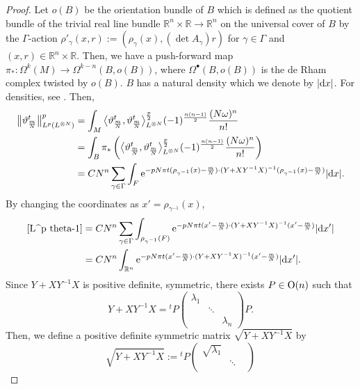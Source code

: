 \documentclass[10pt,a4paper]{amsart}
\numberwithin{equation}{section}
\newcommand{\R}{\mathbb{R}}
\newcommand{\abs}[1]{\lvert#1\rvert}
\begin{document}
\begin{proof}
Let $o(B)$ be the orientation bundle of $B$ which is defined as the quotient bundle of the trivial real line bundle $\R^n\times \R \to \R^n$ on the universal cover of $B$ by the $\Gamma$-action $\rho'_\gamma (x,r):=\left(\rho_\gamma (x), (\det A_\gamma) r\right)$ for $\gamma \in \Gamma$ and $(x,r)\in \R^n\times \R$. Then, we have a push-forward map~${\pi_*\colon \Omega^k(M)\to \Omega^{k-n}(B,o(B))}$, where $\Omega^\bullet (B,o(B))$ is the de Rham complex twisted by $o(B)$. $B$ has a natural density which we denote by $\abs{{\rm d}x}$. For densities, see \cite[Chapter I, Section~7]{BT}. Then,
\begin{align}
\big\|\vartheta^t_{\frac{m}{N}}\big\|_{L^p(L^{\otimes N})}^p&=\int_M\big\langle \vartheta^t_{\frac{m}{N}}, \vartheta^t_{\frac{m}{N}}\big\rangle_{L^{\otimes N}}^{\frac{p}{2}} (-1)^{\frac{n(n-1)}{2}}\dfrac{(N\omega)^n}{n!}\nonumber \\
&=\int_B\pi_*\left(\big\langle \vartheta^t_{\frac{m}{N}}, \vartheta^t_{\frac{m}{N}}\big\rangle_{L^{\otimes N}}^{\frac{p}{2}} (-1)^{\frac{n(n-1)}{2}}\dfrac{(N\omega)^n}{n!}\right) \nonumber\\
&=CN^n\sum_{\gamma \in \Gamma}\int_F {\rm e}^{-pN\pi t(\rho_{\gamma^{-1}}(x)-\frac{m}{N})\cdot (Y+XY^{-1}X)^{-1}(\rho_{\gamma^{-1}}(x)-\frac{m}{N})}\abs{{\rm d}x}.\label{L^p theta-1}
\end{align}
By changing the coordinates as $x'=\rho_{\gamma^{-1}}(x)$,
\begin{align}
\eqref{L^p theta-1}&=CN^n\sum_{\gamma \in \Gamma}\int_{\rho_{\gamma^{-1}}(F)} {\rm e}^{-pN\pi t(x'-\frac{m}{N} )\cdot (Y+XY^{-1}X)^{-1}(x'-\frac{m}{N} )} \abs{{\rm d}x'}\nonumber\\
&=CN^n\int_{\R^n} {\rm e}^{-pN\pi t(x'-\frac{m}{N} )\cdot (Y+XY^{-1}X)^{-1}(x'-\frac{m}{N} )} \abs{{\rm d}x'}.\label{L^p theta-2}
\end{align}
Since $Y+XY^{-1}X$ is positive definite, symmetric, there exists $P\in {\rm O}(n)$ such that
\[
Y+XY^{-1}X={}^tP
\begin{pmatrix}
\lambda_1 & & \\
& \ddots & \\
 & & \lambda_n
\end{pmatrix}P.
\]
Then, we define a positive definite symmetric matrix $\sqrt{Y+XY^{-1}X}$ by
\[%
\sqrt{Y+XY^{-1}X}:={}^tP
\begin{pmatrix}
\sqrt{\lambda_1} & & \\
& \ddots & \\

\end{pmatrix}\]
\end{proof}
\end{document}
